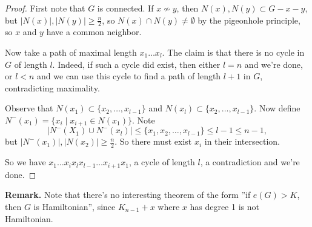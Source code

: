 \documentclass{article}
\theoremstyle{definition}
\begin{document}
\begin{proof}
    First note that $G$ is connected. If $x \not\sim y$, then $N(x), N(y) \subset G-x-y$, but $|N(x)|,|N(y)|\ge \frac{n}{2}$, so $N(x) \cap N(y) \neq \emptyset$ by the pigeonhole principle, so $x$ and $y$ have a common neighbor.
    \vspace{1mm}
    
    Now take a path of maximal length $x_1\ldots x_l$. The claim is that there is no cycle in $G$ of length $l$. Indeed, if such a cycle did exist, then either $l=n$ and we're done, or $l<n$ and we can use this cycle to find a path of length $l+1$ in $G$, contradicting maximality.
    \vspace{1mm}
    
    Observe that $N(x_1) \subset \{x_2,\ldots,x_{l-1}\}$ and $N(x_l) \subset \{x_2,\ldots,x_{l-1}\}$. Now define $N^-(x_1) = \{x_i \mid x_{i+1} \in N(x_1)\}$. Note $$|N^-(X_1) \cup N^-(x_l)| \le \{x_1,x_2,\ldots,x_{l-1}\}\le l-1\le n-1,$$ 
    but $|N^-(x_1)|,|N(x_2)| \ge \frac{n}{2}$. So there must exist $x_i$ in their intersection.
    \vspace{1mm}
    
    So we have $x_1 \ldots x_{i} x_l x_{l-1} \ldots x_{i+1} x_1$, a cycle of length $l$, a contradiction and we're done.
\end{proof}
\textbf{Remark.} Note that there's no interesting theorem of the form ''if $e(G) > K$, then $G$ is Hamiltonian'', since $K_{n-1} + x$ where $x$ has degree 1 is not Hamiltonian.
\end{document}
